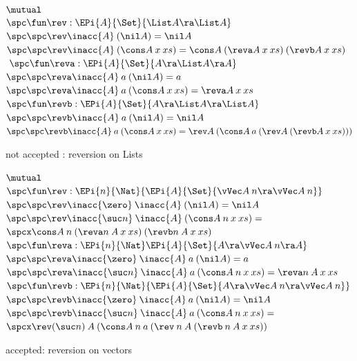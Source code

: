 \begin{figure}[htp]
$\mutual $  \\
$ \spc \fun \rev : \EPi{A}{\Set}{\List A \ra  \List A} $ \\
$ \spc \spc \rev \inacc{A} \: (\nil A ) = \nil A$\\
$ \spc \spc \rev \inacc{A} \: (\cons A \:x  \: xs) = \cons A \: (\reva A \: x \: xs) \: (\revb A \: x \: xs)$\\
$\ \spc \fun \reva : \EPi{A }{\Set}{A  \ra \List A \ra A}$\\
$ \spc \spc \reva \inacc{A} \: a \: (\nil A ) = a$ \\
$\spc \spc \reva \inacc{A} \: a \: (\cons A \: x \: xs) = \reva A \: x \: xs$\\
$\spc \fun \revb : \EPi{A}{\Set}{ A \ra \List A \ra \List A} $\\
$\spc \spc \revb \inacc{A} \: a \: (\nil A ) = \nil A $\\
$\spc \spc \revb \inacc{A} \: a \: (\cons A\:  x \: xs) = \rev A \: (\cons A \: a \: (\rev A \: (\revb A \: x \: xs)))$
\caption{not accepted : reversion on Lists}  
\label{lrev}
\end{figure}

\begin{figure}[htp] 
$\mutual $ \\
$\spc \fun \rev : \EPi{n}{\Nat }{\EPi{A}{\Set }{\vVec A \: n \ra \vVec A \: n}}$\\
$\spc \spc \rev \inacc{\zero} \: \inacc{A}  \: (\nil A) = \nil A $\\
$\spc \spc \rev \inacc{\suc n} \: \inacc{A} \: (\cons A \: n \: x \: xs) = $\\
$\spcx \cons A \: n \: (\reva n \: A \: x \: xs) \: (\revb n \: A \: x \: xs) $ \\
$\spc \fun \reva : \EPi{n}{\Nat}\EPi{A}{\Set}{A \ra \vVec A \: n \ra A}$\\
$\spc \spc \reva \inacc{\zero} \: \inacc{A} \: a \: (\nil A) = a $\\
$\spc \spc \reva \inacc{\suc n} \: \inacc{A} \: a \: (\cons A \: n \: x \: xs) = \reva n \: A \: x \: xs $\\
$\spc \fun \revb : \EPi{n}{\Nat}{\EPi{A}{\Set}{A \ra \vVec A \: n \ra \vVec A \: n}}$\\
$ \spc \spc \revb \inacc{\zero} \: \inacc{A}  \: a \: (\nil A) = \nil A $\\
$ \spc \spc \revb \inacc{\suc n} \: \inacc{A} \: a \: (\cons A \: n \: x \: xs) = $\\
$ \spcx \rev (\suc n) \: A \: (\cons A \: n \: a \: (\rev \: n \: A \: (\revb \: n \: A \: x \: xs))$
\caption{accepted: reversion on vectors}  
\label{vref}
\end{figure}  

